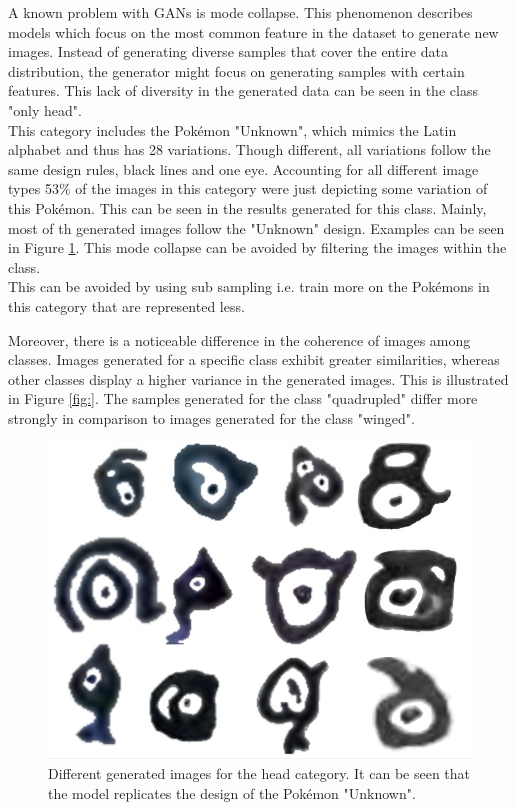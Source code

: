 \documentclass[12pt]{article}
\theoremstyle{plain}
\theoremstyle{definition}
\theoremstyle{remark}
\begin{document}
A known problem with \ac{GAN}s is mode collapse. This phenomenon describes models which focus on the most common feature in the dataset to generate new images. Instead of generating diverse samples that cover the entire data distribution, the generator might focus on generating samples with certain features. This lack of diversity in the generated data can be seen in the class "only head".\\
This category includes the Pokémon "Unknown", which mimics the Latin alphabet and thus has 28 variations. Though different, all variations follow the same design rules, black lines and one eye. Accounting for all different image types 53\% of the images in this category were just depicting some variation of this Pokémon. This can be seen in the results generated for this class. Mainly, most of th generated images follow the "Unknown" design. Examples can be seen in Figure \ref{fig:unknownvariety}. This mode collapse can be avoided by filtering the images within the class.\\
This can be avoided by using sub sampling i.e. train more on the Pokémons in this category that are represented less. 
 


Moreover, there is a noticeable difference in the coherence of images among classes. Images generated for a specific class exhibit greater similarities, whereas other classes display a higher variance in the generated images. This is illustrated in Figure \ref{fig:}. The samples generated for the class "quadrupled" differ more strongly in comparison to images generated for the class "winged".

\begin{figure}[H]
	\centering
	\includegraphics[width=0.5\linewidth]{src/Images/head_generated}
	\caption[Generated images for head]{Different generated images for the head category. It can be seen that the model replicates the design of the Pokémon "Unknown".}
	\label{fig:unknownvariety}
\end{figure}
\end{document}
